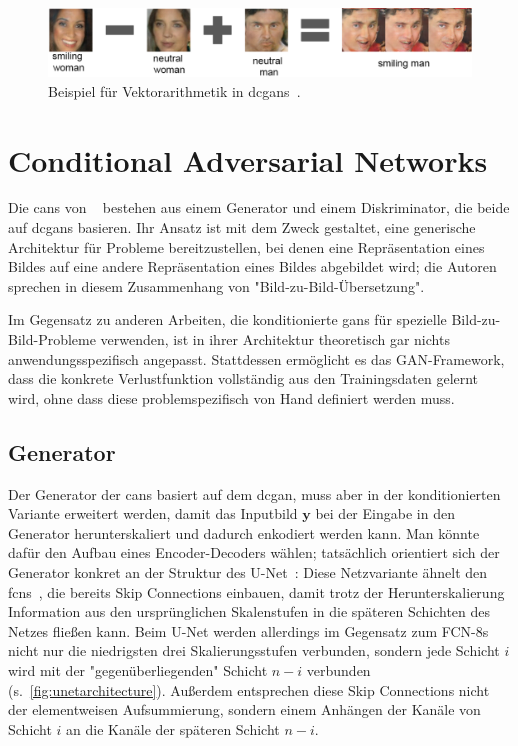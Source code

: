 \begin{figure}
	\centering
	\includegraphics[width=0.9\linewidth]{img/dcgan_arithmetic}
	\caption{Beispiel für Vektorarithmetik in \glspl{dcgan}~\cite{Radford.2016}.}
	\label{fig:dcganarithmetic}
\end{figure}



\section{Conditional Adversarial Networks}

Die \glspl{can} von \citeauthor{Isola.2017}~\cite{Isola.2017} bestehen aus einem Generator und einem Diskriminator, die beide auf \glspl{dcgan} basieren.
Ihr Ansatz ist mit dem Zweck gestaltet, eine generische Architektur für Probleme bereitzustellen, bei denen eine Repräsentation eines Bildes auf eine andere Repräsentation eines Bildes abgebildet wird; die Autoren sprechen in diesem Zusammenhang von "Bild-zu-Bild-Übersetzung".

Im Gegensatz zu anderen Arbeiten, die konditionierte \glspl{gan} für spezielle Bild-zu-Bild-Probleme verwenden, ist in ihrer Architektur theoretisch gar nichts anwendungsspezifisch angepasst.
Stattdessen ermöglicht es das GAN-Framework, dass die konkrete Verlustfunktion vollständig aus den Trainingsdaten gelernt wird, ohne dass diese problemspezifisch von Hand definiert werden muss.



\subsection{Generator}

Der Generator der \glspl{can} basiert auf dem \gls{dcgan}, muss aber in der konditionierten Variante erweitert werden, damit das Inputbild $ \mathbf{y} $ bei der Eingabe in den Generator herunterskaliert und dadurch enkodiert werden kann.
Man könnte dafür den Aufbau eines Encoder-Decoders wählen; tatsächlich orientiert sich der Generator konkret an der Struktur des U-Net~\cite{Ronneberger.2015}:
Diese Netzvariante ähnelt den \glspl{fcn}~\cite{Long.2015}, die bereits Skip Connections einbauen, damit trotz der Herunterskalierung Information aus den ursprünglichen Skalenstufen in die späteren Schichten des Netzes fließen kann.
Beim U-Net werden allerdings im Gegensatz zum FCN-8s nicht nur die niedrigsten drei Skalierungsstufen verbunden, sondern jede Schicht $ i $ wird mit der "gegenüberliegenden" Schicht $ n-i $ verbunden (s.~\autoref{fig:unetarchitecture}).
Außerdem entsprechen diese Skip Connections nicht der elementweisen Aufsummierung, sondern einem Anhängen der Kanäle von Schicht $ i $ an die Kanäle der späteren Schicht $ n-i $.

